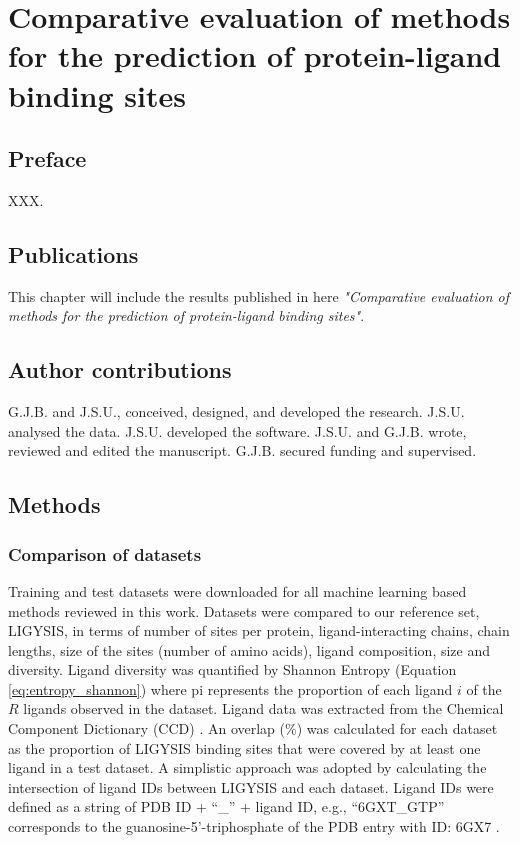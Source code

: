 \chapter{Comparative evaluation of methods for the prediction of protein-ligand binding sites}

\section*{Preface}

XXX.

\section*{Publications}

This chapter will include the results published in here \textit{"Comparative evaluation of methods for the prediction of protein-ligand binding sites"}.

\section*{Author contributions}

G.J.B. and J.S.U., conceived, designed, and developed the research. J.S.U. analysed the data. J.S.U. developed the software. J.S.U. and G.J.B. wrote, reviewed and edited the manuscript. G.J.B. secured funding and supervised.

\section{Methods}

\subsection{Comparison of datasets}

Training and test datasets were downloaded for all machine learning based methods reviewed in this work. Datasets were compared to our reference set, LIGYSIS, in terms of number of sites per protein, ligand-interacting chains, chain lengths, size of the sites (number of amino acids), ligand composition, size and diversity. Ligand diversity was quantified by Shannon Entropy \cite{SHANNON_1948_ENTROPY} (Equation \ref{eq:entropy_shannon}) where pi represents the proportion of each ligand $i$ of the $R$ ligands observed in the dataset. Ligand data was extracted from the Chemical Component Dictionary (CCD) \cite{WESTBROOK_2015_CCD}. An overlap (\%) was calculated for each dataset as the proportion of LIGYSIS binding sites that were covered by at least one ligand in a test dataset. A simplistic approach was adopted by calculating the intersection of ligand IDs between LIGYSIS and each dataset. Ligand IDs were defined as a string of PDB ID + ``\_'' + ligand ID, e.g., ``6GXT\_GTP'' corresponds to the guanosine-5’-triphosphate of the PDB entry with ID: 6GX7 \cite{CAMPANACCI_2019_TUBULIN}.

